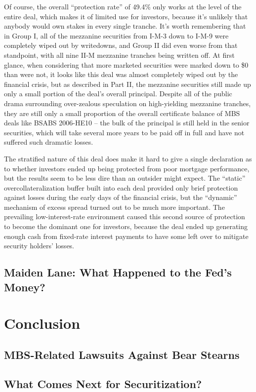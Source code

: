 \documentclass[12pt]{article}
\begin{document}
Of course, the overall “protection rate” of 49.4\% only works at the level of the entire deal, which makes it of limited use for investors, because it’s unlikely that anybody would own stakes in every single tranche. It’s worth remembering that in Group I, all of the mezzanine securities from I-M-3 down to I-M-9 were completely wiped out by writedowns, and Group II did even worse from that standpoint, with all nine II-M mezzanine tranches being written off. At first glance, when considering that more marketed securities were marked down to \$0 than were not, it looks like this deal was almost completely wiped out by the financial crisis, but as described in Part II, the mezzanine securities still made up only a small portion of the deal’s overall principal. Despite all of the public drama surrounding over-zealous speculation on high-yielding mezzanine tranches, they are still only a small proportion of the overall certificate balance of MBS deals like BSABS 2006-HE10 – the bulk of the principal is still held in the senior securities, which will take several more years to be paid off in full and have not suffered such dramatic losses.

The stratified nature of this deal does make it hard to give a single declaration as to whether investors ended up being protected from poor mortgage performance, but the results seem to be less dire than an outsider might expect. The “static” overcollateralization buffer built into each deal provided only brief protection against losses during the early days of the financial crisis, but the “dynamic” mechanism of excess spread turned out to be much more important. The prevailing low-interest-rate environment caused this second source of protection to become the dominant one for investors, because the deal ended up generating enough cash from fixed-rate interest payments to have some left over to mitigate security holders’ losses. 

\subsection*{Maiden Lane: What Happened to the Fed's Money?}

\section*{Conclusion}

\subsection*{MBS-Related Lawsuits Against Bear Stearns}

\subsection*{What Comes Next for Securitization?}
\end{document}

